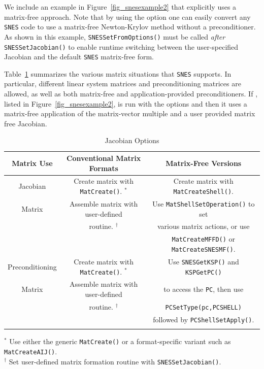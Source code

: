 We include an example in Figure~\ref{fig_snesexample2} that explicitly
uses a matrix-free approach.  Note that by using the option
 one can easily convert any \lstinline{SNES} code to use a matrix-free
Newton-Krylov method without a preconditioner.  As shown in this
example, \lstinline{SNESSetFromOptions()} must be called {\em after}
\lstinline{SNESSetJacobian()} to enable runtime switching between the
user-specified Jacobian and the default \lstinline{SNES} matrix-free form.

Table~\ref{tab_jacobians} summarizes the various matrix situations
that \lstinline{SNES} supports.  In particular, different linear system matrices
and preconditioning matrices are allowed, as well as both matrix-free
and application-provided preconditioners.  If
\href{https://www.mcs.anl.gov/petsc/petsc-current/src/snes/tutorials/ex3.c.html}{},
 listed in Figure~\ref{fig_snesexample2}, is run with the options  and  then it uses a matrix-free application of the matrix-vector multiple and a user provided matrix free Jacobian.

\begin{center}
\begin{table}
\begin{tabular}{ccc}
{\bf Matrix Use} & {\bf Conventional Matrix Formats}                & {\bf Matrix-Free Versions}\\
\hline
Jacobian         & Create matrix with \lstinline|MatCreate()|. $^*$ & Create matrix with \lstinline|MatCreateShell()|.\\
Matrix           & Assemble matrix with user-defined                & Use \lstinline|MatShellSetOperation()| to set\\
                 & routine. $ ^\dagger $                            & various matrix actions, or use\\
                 &                                                  & \lstinline|MatCreateMFFD()| or \lstinline|MatCreateSNESMF()|.\\
\hline
Preconditioning  & Create matrix with \lstinline|MatCreate()|. $^*$ & Use \lstinline|SNESGetKSP()| and \lstinline|KSPGetPC()| \\
Matrix           & Assemble matrix with user-defined                & to access the \lstinline|PC|, then use\\
                 & routine. $ ^\dagger $                            & \lstinline|PCSetType(pc,PCSHELL)|\\
                 &                                                  & followed by \lstinline|PCShellSetApply()|. \\

\hline
& & \\
\end{tabular}
\medskip
$^*$ Use either the generic \lstinline|MatCreate()| or a format-specific variant
   such as \lstinline|MatCreateAIJ()|.\\
$^\dagger$ Set user-defined matrix formation routine with \lstinline{SNESSetJacobian()}.
\medskip
\caption{Jacobian Options}
\label{tab_jacobians}
\end{table}
\end{center}

